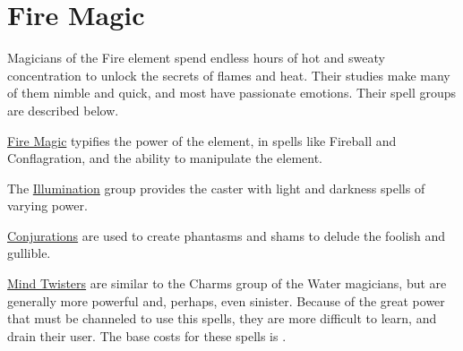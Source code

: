\chapter{Fire Magic}
\label{ch:elemental-fire-magic}

Magicians of the Fire element spend endless hours of hot and sweaty concentration to unlock the secrets of flames and heat. Their studies make many of them nimble and quick, and most have passionate emotions. Their spell groups are described below.

\ul{Fire Magic} typifies the power of the element, in spells like Fireball and Conflagration, and the ability to manipulate the element.

The \ul{Illumination} group provides the caster with light and darkness spells of varying power.

\ul{Conjurations} are used to create phantasms and shams to delude the foolish and gullible.

\ul{Mind Twisters} are similar to the Charms group of the Water magicians, but are generally more powerful and, perhaps, even sinister. Because of the great power that must be channeled to use this spells, they are more difficult to learn, and drain their user. The base costs for these spells is . 

